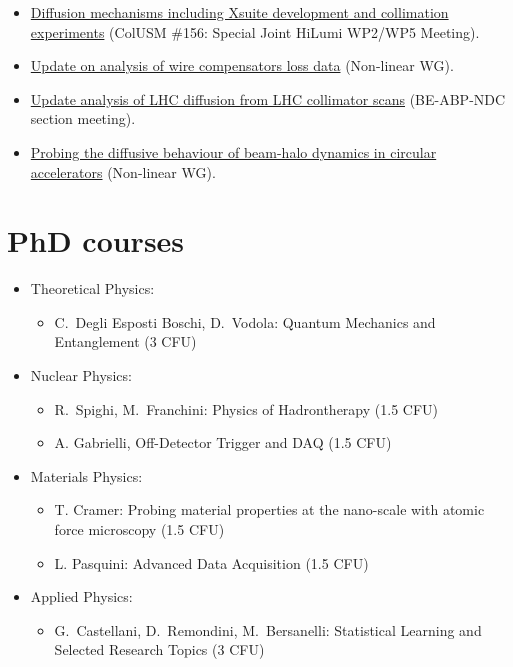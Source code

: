 \begin{itemize}
    \item \href{https://indico.cern.ch/event/1212187/#15-diffusion-mechanisms-includ}{Diffusion mechanisms including Xsuite development and collimation experiments} (ColUSM \#156: Special Joint HiLumi WP2/WP5 Meeting).
    \item \href{https://indico.cern.ch/event/1188011/#2-update-on-analysis-of-wire-c}{Update on analysis of wire compensators loss data} (Non-linear WG).     
    \item \href{https://indico.cern.ch/event/1162317/#21-update-analysis-of-lhc-diff}{Update analysis of LHC diffusion from LHC collimator scans} (BE-ABP-NDC section meeting).
    \item \href{https://indico.cern.ch/event/1100158/#2-probing-the-diffusive-behavi}{Probing the diffusive behaviour of beam-halo dynamics in circular accelerators} (Non-linear WG).
\end{itemize}

\section*{PhD courses}

\begin{itemize}
    \item Theoretical Physics:
    \begin{itemize}
        \item C.\ Degli Esposti Boschi, D.\ Vodola: Quantum Mechanics and Entanglement (3 CFU)
    \end{itemize}
    \item Nuclear Physics:
    \begin{itemize}
        \item R.\ Spighi, M.\ Franchini: Physics of Hadrontherapy (1.5 CFU)
        \item A. Gabrielli, Off-Detector Trigger and DAQ (1.5 CFU)
    \end{itemize}
    \item Materials Physics:
    \begin{itemize}
        \item T. Cramer: Probing material properties at the nano-scale with atomic force microscopy (1.5 CFU)
        \item L. Pasquini: Advanced Data Acquisition (1.5 CFU)
    \end{itemize}
    \item Applied Physics:
    \begin{itemize}
        \item G.\ Castellani, D.\ Remondini, M.\ Bersanelli: Statistical Learning and Selected Research Topics (3 CFU) 
    \end{itemize} 
\end{itemize} 

